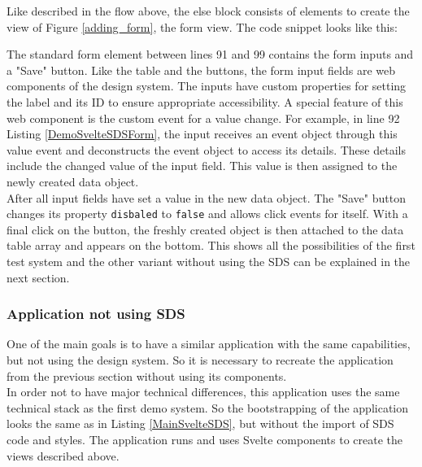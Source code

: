 Like described in the flow above, the else block consists of elements to create the view of Figure \ref{adding_form}, the form view. The code snippet looks like this:

The standard form element between lines 91 and 99 contains the form inputs and a "Save" button. Like the table and the buttons, the form input fields are web components of the design system. The inputs have custom properties for setting the label and its ID to ensure appropriate accessibility. A special feature of this web component is the custom event for a value change. For example, in line 92 Listing \ref{DemoSvelteSDSForm}, the input receives an event object through this value event and deconstructs the event object to access its details. These details include the changed value of the input field. This value is then assigned to the newly created data object. \\
After all input fields have set a value in the new data object. The "Save" button changes its property \texttt{disbaled} to \texttt{false} and allows click events for itself. With a final click on the button, the freshly created object is then attached to the data table array and appears on the bottom. This shows all the possibilities of the first test system and the other variant without using the SDS can be explained in the next section.

\subsubsection{Application not using \ac{SDS}}
One of the main goals is to have a similar application with the same capabilities, but not using the design system. So it is necessary to recreate the application from the previous section without using its components. \\
In order not to have major technical differences, this application uses the same technical stack as the first demo system. So the bootstrapping of the application looks the same as in Listing \ref{MainSvelteSDS}, but without the import of SDS code and styles. The application runs and uses Svelte components to create the views described above. \\

